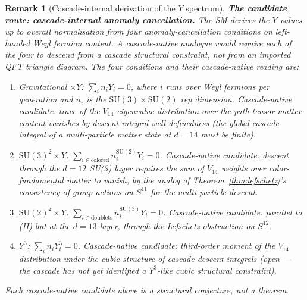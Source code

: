 \documentclass[12pt,a4paper]{article}
\newtheorem{remark}[theorem]{Remark}
\begin{document}
\begin{remark}[Cascade-internal derivation of the $Y$ spectrum]
\medskip\noindent\textbf{The candidate route: cascade-internal anomaly
cancellation.} The SM derives the $Y$ values up to overall
normalisation from four anomaly-cancellation conditions on
left-handed Weyl fermion content. A cascade-native analogue would
require each of the four to descend from a cascade structural
constraint, not from an imported QFT triangle diagram. The four
conditions and their cascade-native reading are:
\begin{enumerate}
\item[(I)] \emph{Gravitational $\times Y$:} $\sum_i n_i Y_i = 0$,
where $i$ runs over Weyl fermions per generation and $n_i$ is the
$\mathrm{SU}(3)\times\mathrm{SU}(2)$ rep dimension. Cascade-native
candidate: trace of the $V_{14}$-eigenvalue distribution over the
path-tensor matter content vanishes by descent-integral
well-definedness (the global cascade integral of a multi-particle
matter state at $d=14$ must be finite).
\item[(II)] \emph{$\mathrm{SU}(3)^2\times Y$:}
$\sum_{i\in\text{colored}} n_i^{\mathrm{SU}(2)} Y_i = 0$. Cascade-native
candidate: descent through the $d=12$ SU(3) layer requires the
sum of $V_{14}$ weights over color-fundamental matter to vanish, by
the analog of Theorem~\ref{thm:lefschetz}'s consistency of group
actions on $S^{11}$ for the multi-particle descent.
\item[(III)] \emph{$\mathrm{SU}(2)^2\times Y$:}
$\sum_{i\in\text{doublets}} n_i^{\mathrm{SU}(3)} Y_i = 0$.
Cascade-native candidate: parallel to (II) but at the $d=13$ layer,
through the Lefschetz obstruction on $S^{12}$.
\item[(IV)] \emph{$Y^3$:} $\sum_i n_i Y_i^3 = 0$. Cascade-native
candidate: third-order moment of the $V_{14}$ distribution under
the cubic structure of cascade descent integrals (open --- the
cascade has not yet identified a $Y^3$-like cubic structural
constraint).
\end{enumerate}
Each cascade-native candidate above is a structural conjecture, not
a theorem.


\end{remark}
\end{document}
